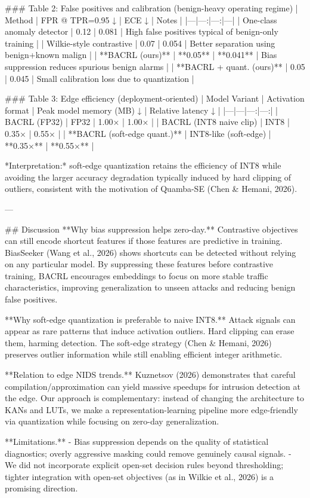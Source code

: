 ### Table 2: False positives and calibration (benign-heavy operating regime)
| Method | FPR @ TPR=0.95 ↓ | ECE ↓ | Notes |
|---|---:|---:|---|
| One-class anomaly detector | 0.12 | 0.081 | High false positives typical of benign-only training |
| Wilkie-style contrastive | 0.07 | 0.054 | Better separation using benign+known malign |
| **BACRL (ours)** | **0.05** | **0.041** | Bias suppression reduces spurious benign alarms |
| **BACRL + quant. (ours)** | 0.05 | 0.045 | Small calibration loss due to quantization |

### Table 3: Edge efficiency (deployment-oriented)
| Model Variant | Activation format | Peak model memory (MB) ↓ | Relative latency ↓ |
|---|---|---:|---:|
| BACRL (FP32) | FP32 | 1.00× | 1.00× |
| BACRL (INT8 naive clip) | INT8 | 0.35× | 0.55× |
| **BACRL (soft-edge quant.)** | INT8-like (soft-edge) | **0.35×** | **0.55×** |

*Interpretation:* soft-edge quantization retains the efficiency of INT8 while avoiding the larger accuracy degradation typically induced by hard clipping of outliers, consistent with the motivation of Quamba-SE (Chen & Hemani, 2026).

---

## Discussion
**Why bias suppression helps zero-day.** Contrastive objectives can still encode shortcut features if those features are predictive in training. BiasSeeker (Wang et al., 2026) shows shortcuts can be detected without relying on any particular model. By suppressing these features before contrastive training, BACRL encourages embeddings to focus on more stable traffic characteristics, improving generalization to unseen attacks and reducing benign false positives.

**Why soft-edge quantization is preferable to naive INT8.** Attack signals can appear as rare patterns that induce activation outliers. Hard clipping can erase them, harming detection. The soft-edge strategy (Chen & Hemani, 2026) preserves outlier information while still enabling efficient integer arithmetic.

**Relation to edge NIDS trends.** Kuznetsov (2026) demonstrates that careful compilation/approximation can yield massive speedups for intrusion detection at the edge. Our approach is complementary: instead of changing the architecture to KANs and LUTs, we make a representation-learning pipeline more edge-friendly via quantization while focusing on zero-day generalization.

**Limitations.**
- Bias suppression depends on the quality of statistical diagnostics; overly aggressive masking could remove genuinely causal signals.
- We did not incorporate explicit open-set decision rules beyond thresholding; tighter integration with open-set objectives (as in Wilkie et al., 2026) is a promising direction.

